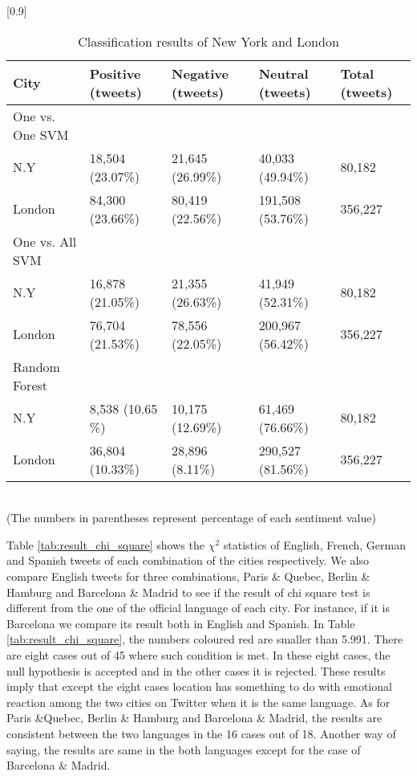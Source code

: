 \documentclass[twocolumn]{article}
\begin{document}
\begin{table}[ht]
	\caption{Classification results of New York and London}
	\scalebox{0.8}[0.9]{
	\begin{tabular}{|l|p{1.5cm}|p{1.5cm}|p{1.5cm}|p{1.5cm}|} \hline
	City&Positive (tweets)&Negative (tweets)&Neutral (tweets)&Total (tweets)\\ \hline
	One vs. One SVM & {} & {} & {} & {}\\ \hline
	N.Y  & 18,504 (23.07\%) & 21,645 (26.99\%)  & 40,033 (49.94\%) & 80,182\\
	London & 84,300 (23.66\%)& 80,419 (22.56\%)& 191,508 (53.76\%)& 356,227\\ \hline
	One vs. All SVM & {} & {} & {} & {}\\ \hline
	N.Y  & 16,878 (21.05\%)& 21,355 (26.63\%)& 41,949 (52.31\%)& 80,182\\
	London & 76,704 (21.53\%)& 78,556 (22.05\%)& 200,967 (56.42\%)& 356,227\\ \hline
	Random Forest & {} & {} & {} & {}\\ \hline
	N.Y  & 8,538 (10.65 \%)& 10,175 (12.69\%)& 61,469 (76.66\%)& 80,182\\ 
	London & 36,804 (10.33\%)& 28,896 (8.11\%)& 290,527 (81.56\%)& 356,227\\ \hline

	\end{tabular}
	}
	\label{tab:result_ny_london}
	\\(The numbers in parentheses represent percentage of each sentiment value)
\end{table}

Table \ref{tab:result_chi_square} shows the $\chi^2$ statistics of English, French, German and Spanish tweets of each combination of the cities respectively.
We also compare English tweets for three combinations, Paris \& Quebec, Berlin \& Hamburg and Barcelona \& Madrid to see if the result of chi square test is different from the one of the official language of each city.
For instance, if it is Barcelona we compare its result both in English and Spanish.
In Table \ref{tab:result_chi_square}, the numbers coloured red are smaller than 5.991.
There are eight cases out of 45 where such condition is met.
In these eight cases, the null hypothesis is accepted and in the other cases it is rejected.
These results imply that except the eight cases location has something to do with emotional reaction among the two cities on Twitter when it is the same language. 
As for Paris \&Quebec, Berlin \& Hamburg and Barcelona \& Madrid, the results are consistent between the two languages in the 16 cases out of 18.
Another way of saying, the results are same in the both languages except for the case of Barcelona \& Madrid.
\end{document}
